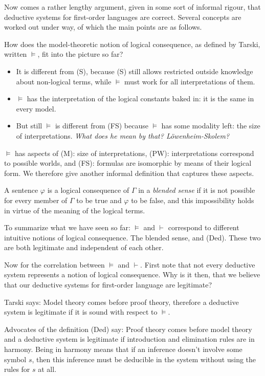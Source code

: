 \documentclass[a4paper]{article}
\begin{document}
Now comes a rather lengthy argument, given in some sort of informal rigour,
that deductive systems for first-order languages are correct.  Several concepts
are worked out under way, of which the main points are as follows.

How does the model-theoretic notion of logical consequence, as defined by
Tarski, written $\models$, fit into the picture so far?
\begin{itemize}
  \item It is different from (S), because (S) still allows restricted outside
  knowledge about non-logical terms, while $\models$ must work for all
  interpretations of them.

  \item $\models$ has the interpretation of the logical constants baked in: it
  is the same in every model.

  \item But still $\models$ is different from (FS) because $\models$ has some
  modality left: the size of interpretations.  \emph{What does he mean by that?
  Löwenheim-Skolem?}

\end{itemize}

$\models$ has aspects of (M): size of interpretations, (PW): interpretations
correspond to possible worlds, and (FS): formulas are isomorphic by means of
their logical form.  We therefore give another informal definition that captures
these aspects.

A sentence $\varphi$ is a logical consequence of $\Gamma$ in a \emph{blended
sense} if it is not possible for every member of $\Gamma$ to be true and
$\varphi$ to be false, and this impossibility holds in virtue of the meaning of
the logical terms.

To summarize what we have seen so far:  $\models$ and $\vdash$ correspond to
different intuitive notions of logical consequence.  The blended sense, and
(Ded).  These two are both legitimate and independent of each other.

Now for the correlation between $\models$ and $\vdash$. First note that not
every deductive system represents a notion of logical consequence.  Why is it
then, that we believe that our deductive systems for first-order language are
legitimate?

Tarski says: Model theory comes before proof theory, therefore a deductive
system is legitimate if it is sound with respect to $\models$.

Advocates of the definition (Ded) say: Proof theory comes before model theory
and a deductive system is legitimate if introduction and elimination rules are
in harmony.  Being in harmony means that if an inference doesn't involve some
symbol $s$, then this inference must be deducible in the system without using
the rules for $s$ at all.
\end{document}
